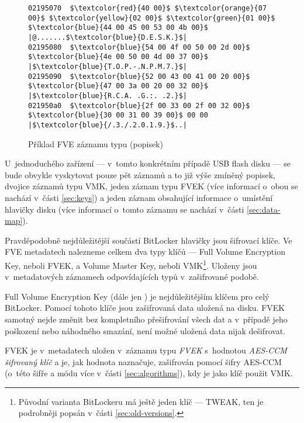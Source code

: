 \begin{figure}[h]
		\centering
		\captionsetup{width=0.65\linewidth}
\begin{lstlisting}[frame=none, escapechar=$, basicstyle=\ttfamily\small, columns=fullflexible, keepspaces=true]
02195070  $\textcolor{red}{40 00}$ $\textcolor{orange}{07 00}$ $\textcolor{yellow}{02 00}$ $\textcolor{green}{01 00}$  $\textcolor{blue}{44 00 45 00 53 00 4b 00}$ |@.......$\textcolor{blue}{D.E.S.K.}$|
02195080  $\textcolor{blue}{54 00 4f 00 50 00 2d 00}$  $\textcolor{blue}{4e 00 50 00 4d 00 37 00}$ |$\textcolor{blue}{T.O.P.-.N.P.M.7.}$|
02195090  $\textcolor{blue}{52 00 43 00 41 00 20 00}$  $\textcolor{blue}{47 00 3a 00 20 00 32 00}$ |$\textcolor{blue}{R.C.A. .G.:. .2.}$|
021950a0  $\textcolor{blue}{2f 00 33 00 2f 00 32 00}$  $\textcolor{blue}{30 00 31 00 39 00}$ 00 00 |$\textcolor{blue}{/.3./.2.0.1.9.}$..|
\end{lstlisting}
		\caption{Příklad FVE záznamu typu  (popisek)}
		\label{fig:fve-entry-desc}
\end{figure}

U~jednoduchého zařízení --- v~tomto konkrétním případě USB flash disku --- se bude obvykle vyskytovat pouze pět záznamů a to již výše zmíněný popisek, dvojice záznamů typu VMK, jeden záznam typu FVEK (více informací o~obou se nachází v~části \ref{sec:keys}) a jeden záznam obsahující informace o~umístění hlavičky disku (více informací o~tomto záznamu se nachází v~části \ref{sec:data-map}).

\label{sec:keys}

Pravděpodobně nejdůležitější součástí BitLocker hlavičky jsou šifrovací klíče. Ve FVE metadatech nalezneme celkem dva typy klíčů --- Full Volume Encryption Key, neboli FVEK, a Volume Master Key, neboli VMK\footnote{Původní varianta BitLockeru má ještě jeden klíč --- TWEAK, ten je podrobněji popsán v~části \ref{sec:old-versions}.}. Uloženy jsou v~metadatových záznamech odpovídajících typů v~zašifrované podobě.


Full Volume Encryption Key (dále jen ) je nejdůležitějším klíčem pro celý BitLocker. Pomocí tohoto klíče jsou zašifrovaná data uložená na disku. FVEK samotný nejde změnit bez kompletního přešifrování všech dat a v~případě jeho poškození nebo náhodného smazání, není možné uložená data nijak dešifrovat.

FVEK je v~metadatech uložen v~záznamu typu \emph{FVEK} s~hodnotou \emph{AES-CCM šifrovaný klíč} a je, jak hodnota naznačuje, zašifrován pomocí šifry AES-CCM (o~této šifře a módu více v~části \ref{sec:algorithms}), kdy je jako klíč použit VMK.

